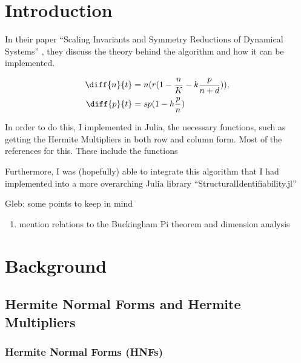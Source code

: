 \documentclass[oneside, a4paper, onecolumn, 11pt]{article}
\begin{document}
\newpage
\tableofcontents
\newpage


\section{Introduction}


In their paper ``Scaling Invariants and Symmetry Reductions of Dynamical Systems'' \cite{Hubert2013}, they discuss the theory behind the algorithm and how it can be implemented.

\begin{align*}
    \diff{n}{t}
     & = n (r (1 - \frac{n}{K} - k \frac{p}{n + d})), \\
    \diff{p}{t}
     & = sp (1 - h \frac{p}{n})
\end{align*}

In order to do this, I implemented in Julia, the necessary functions, such as getting the Hermite Multipliers in both row and column form. Most of the references for this. These include the functions \cite{Hubert2013}

Furthermore, I was (hopefully) able to integrate this algorithm that I had implemented into a more overarching Julia library ``StructuralIdentifiability.jl''

{\color{purple}Gleb: some points to keep in mind
\begin{enumerate}
    \item mention relations to the Buckingham Pi theorem and dimension analysis
\end{enumerate}

}



\section{Background}

\subsection{Hermite Normal Forms and Hermite Multipliers}

\subsubsection{Hermite Normal Forms (HNFs)}
\end{document}
